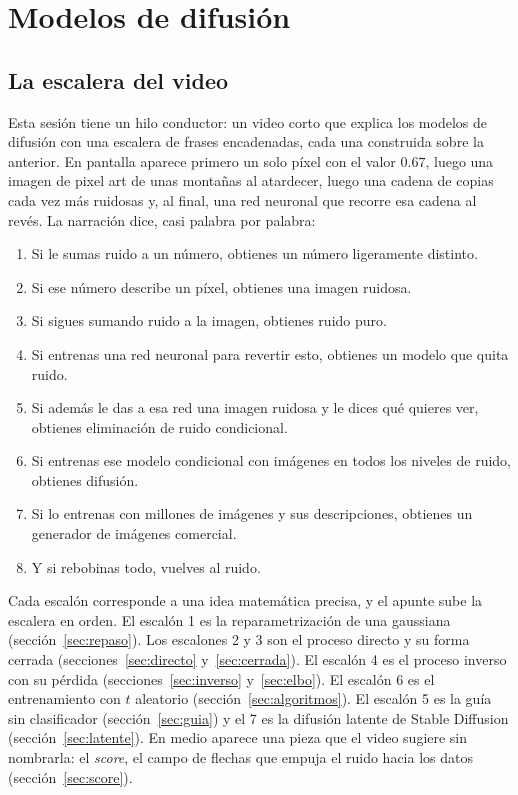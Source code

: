 \documentclass[11pt,letterpaper,oneside]{report}
\begin{document}
\portada
\tableofcontents
\setcounter{chapter}{6}
\chapter{Modelos de difusión}

\section{La escalera del video}

Esta sesión tiene un hilo conductor: un video corto que explica los modelos de difusión con una escalera de frases encadenadas, cada una construida sobre la anterior. En pantalla aparece primero un solo píxel con el valor $0.67$, luego una imagen de pixel art de unas montañas al atardecer, luego una cadena de copias cada vez más ruidosas y, al final, una red neuronal que recorre esa cadena al revés. La narración dice, casi palabra por palabra:

\begin{enumerate}[label=\textbf{\arabic*.}]
  \item Si le sumas ruido a un número, obtienes un número ligeramente distinto.
  \item Si ese número describe un píxel, obtienes una imagen ruidosa.
  \item Si sigues sumando ruido a la imagen, obtienes ruido puro.
  \item Si entrenas una red neuronal para revertir esto, obtienes un modelo que quita ruido.
  \item Si además le das a esa red una imagen ruidosa y le dices qué quieres ver, obtienes eliminación de ruido condicional.
  \item Si entrenas ese modelo condicional con imágenes en todos los niveles de ruido, obtienes difusión.
  \item Si lo entrenas con millones de imágenes y sus descripciones, obtienes un generador de imágenes comercial.
  \item Y si rebobinas todo, vuelves al ruido.
\end{enumerate}

Cada escalón corresponde a una idea matemática precisa, y el apunte sube la escalera en orden. El escalón 1 es la reparametrización de una gaussiana (sección~\ref{sec:repaso}). Los escalones 2 y 3 son el proceso directo y su forma cerrada (secciones~\ref{sec:directo} y~\ref{sec:cerrada}). El escalón 4 es el proceso inverso con su pérdida (secciones~\ref{sec:inverso} y~\ref{sec:elbo}). El escalón 6 es el entrenamiento con $t$ aleatorio (sección~\ref{sec:algoritmos}). El escalón 5 es la guía sin clasificador (sección~\ref{sec:guia}) y el 7 es la difusión latente de Stable Diffusion (sección~\ref{sec:latente}). En medio aparece una pieza que el video sugiere sin nombrarla: el \emph{score}, el campo de flechas que empuja el ruido hacia los datos (sección~\ref{sec:score}).
\end{document}
